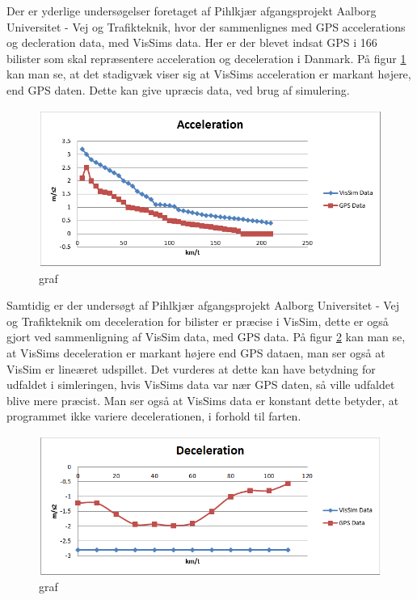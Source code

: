 Der er yderlige undersøgelser foretaget af Pihlkjær afgangsprojekt Aalborg Universitet - Vej og Trafikteknik, hvor der sammenlignes med GPS accelerations og decleration data, med VisSims data. Her er der blevet indsat GPS i 166 bilister som skal repræsentere acceleration og deceleration i Danmark. På figur \ref{GrafForAccelerationVisSimGPS} kan man se, at det stadigvæk viser sig at VisSims acceleration er markant højere, end GPS daten. Dette kan give upræcis data, ved brug af simulering. 

\begin{figure}
\begin{center}
\includegraphics[width=1.0\textwidth]{Pictures/Teknologianalyse/GrafForAccelerationVisSimGPS.png}
\end{center}
\caption{graf}
\label{GrafForAccelerationVisSimGPS}
\end{figure}

Samtidig er der undersøgt af Pihlkjær afgangsprojekt Aalborg Universitet - Vej og Trafikteknik om deceleration for bilister er præcise i VisSim, dette er også gjort ved sammenligning af VisSim data, med GPS data. På figur \ref{GrafForDecelerationVisSimGPS} kan man se, at VisSims deceleration er markant højere end GPS dataen, man ser også at VisSim er lineæret udspillet. Det vurderes at dette kan have betydning for udfaldet i simleringen, hvis VisSims data var nær GPS daten, så ville udfaldet blive mere præcist. Man ser også at VisSims data er konstant dette betyder, at programmet ikke variere decelerationen, i forhold til farten. 

\begin{figure}
\begin{center}
\includegraphics[width=1.0\textwidth]{Pictures/Teknologianalyse/GrafForDecelerationVisSimGPS.png}
\end{center}
\caption{graf}
\label{GrafForDecelerationVisSimGPS}
\end{figure}

